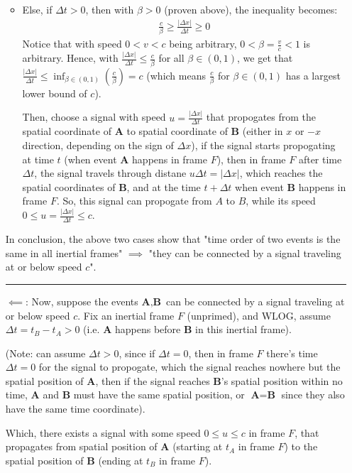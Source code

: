 \documentclass{article}
\newcommand{\bA}{\textbf{A}}
\newcommand{\bB}{\textbf{B}}
\begin{document}
\begin{itemize}
\begin{itemize}
        \item Else, if $\Delta t>0$, then with $\beta >0$ (proven above), the inequality becomes:
        \begin{align}
            \frac{c}{\beta}\geq \frac{|\Delta x|}{\Delta t} \geq 0
        \end{align}
        Notice that with speed $0<v<c$ being arbitrary, $0<\beta=\frac{v}{c}<1$ is arbitrary. Hence, with $\frac{|\Delta x|}{\Delta t}\leq \frac{c}{\beta}$ for all $\beta\in (0,1)$, we get that $\frac{|\Delta x|}{\Delta t}\leq \inf_{\beta\in (0,1)}(\frac{c}{\beta}) = c$ (which means $\frac{c}{\beta}$ for $\beta\in (0,1)$ has a largest lower bound of $c$).

        Then, choose a signal with speed $u = \frac{|\Delta x|}{\Delta t}$ that propogates from the spatial coordinate of $\bA$ to spatial coordinate of $\bB$ (either in $x$ or $-x$ direction, depending on the sign of $\Delta x$), if the signal starts propogating at time $t$ (when event $\bA$ happens in frame $F$), then in frame $F$ after time $\Delta t$, the signal travels through distane $u\Delta t=|\Delta x|$, which reaches the spatial coordinates of $\bB$, and at the time $t+\Delta t$ when event $\bB$ happens in frame $F$. So, this signal can propogate from $A$ to $B$, while its speed $0\leq u = \frac{|\Delta x|}{\Delta t}\leq c$.
    \end{itemize}
    In conclusion, the above two cases show that "time order of two events is the same in all inertial frames" $\implies$ "they can be connected by a signal traveling at or below speed $c$".

    \rule{15.6cm}{0.1mm}

    \item[$\impliedby$:] Now, suppose the events $\bA,\bB$ can be connected by a signal traveling at or below speed $c$. Fix an inertial frame $F$ (unprimed), and WLOG, assume $\Delta t = t_B - t_A > 0$ (i.e. $\bA$ happens before $\bB$ in this inertial frame). 
    
    (Note: can assume $\Delta t>0$, since if $\Delta t = 0$, then in frame $F$ there's time $\Delta t=0$ for the signal to propogate, which the signal reaches nowhere but the spatial position of $\bA$, then if the signal reaches $\bB$'s spatial position within no time, $\bA$ and $\bB$ must have the same spatial position, or $\bA=\bB$ since they also have the same time coordinate).

    Which, there exists a signal with some speed $0\leq u\leq c$ in frame $F$, that propagates from spatial position of $\bA$ (starting at $t_A$ in frame $F$) to the spatial position of $\bB$ (ending at $t_B$ in frame $F$).
    

\end{itemize}
\end{document}

